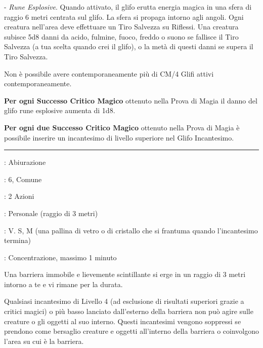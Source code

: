 \begin{multicols}{2}
- \emph{Rune Esplosive}. Quando attivato, il glifo erutta energia magica in una sfera di raggio 6 metri centrata sul glifo. La sfera si propaga intorno agli angoli. Ogni creatura nell'area deve effettuare un Tiro Salvezza su Riflessi. Una creatura subisce 5d8 danni da acido, fulmine, fuoco, freddo o suono se fallisce il Tiro Salvezza (a tua scelta quando crei il glifo), o la metà di questi danni se supera il Tiro Salvezza.

Non è possibile avere contemporaneamente più di CM/4 Glifi attivi contemporaneamente.

\textbf{Per ogni Successo Critico Magico} ottenuto nella Prova di Magia il danno del glifo rune esplosive aumenta di 1d8.

\textbf{Per ogni due Successo Critico Magico} ottenuto nella Prova di Magia è possibile inserire un incantesimo di livello superiore nel Glifo Incantesimo.

\smallskip\noindent\rule{\linewidth}{2pt} \hypertarget{Globo di Invulnerabilità}{}\medskip{}
\noindent
\begin{description}[noitemsep, topsep=0pt, parsep=0pt, partopsep=0pt, leftmargin=0cm, labelwidth=2.8cm]
	\item[\textbf{Lista di Magia}]: Abiurazione
	\item[\textbf{Livello}]: 6, Comune
	\item[\textbf{T. di Lancio}]: 2 Azioni
	\item[\textbf{Gittata}]: Personale (raggio di 3 metri)
	\item[\textbf{Componenti}]: V. S, M (una pallina di vetro o di cristallo che si frantuma quando l'incantesimo termina)
	\item[\textbf{Durata}]: Concentrazione, massimo 1 minuto
\end{description}

Una barriera immobile e lievemente scintillante si erge in un raggio di 3 metri intorno a te e vi rimane per la durata.

Qualsiasi incantesimo di Livello 4 (ad esclusione di risultati superiori grazie a critici magici) o più basso lanciato dall'esterno della barriera non può agire sulle creature o gli oggetti al suo interno. Questi incantesimi vengono soppressi se prendono come bersaglio creature e oggetti all'interno della barriera o coinvolgono l'area su cui è la barriera.


\end{multicols}
